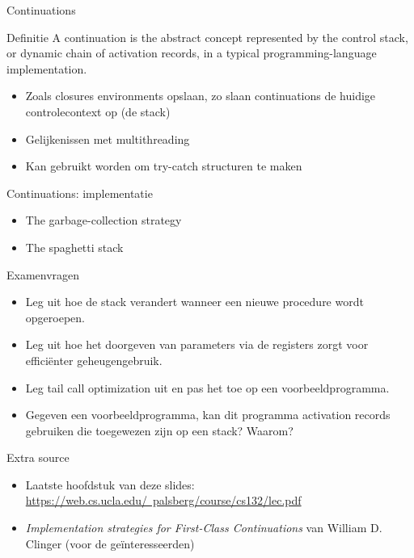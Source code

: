 \documentclass{beamer}
\begin{document}
\begin{frame}{Continuations}
	\begin{block}{Definitie}
	    A continuation is the abstract concept represented by the control stack, or dynamic chain of activation records, in a typical programming-language implementation.
	\end{block}
	\begin{itemize}
	    \item Zoals closures environments opslaan, zo slaan continuations de huidige controlecontext op (de stack)
	    \item Gelijkenissen met multithreading
	    \item Kan gebruikt worden om try-catch structuren te maken
	\end{itemize}
\end{frame}

\begin{frame}{Continuations: implementatie}
	\begin{itemize}
	    \item The garbage-collection strategy
	    \item The spaghetti stack
	\end{itemize}
\end{frame}

\begin{frame}{Examenvragen}
    \begin{itemize}
        \item Leg uit hoe de stack verandert wanneer een nieuwe procedure wordt opgeroepen.
        \item Leg uit hoe het doorgeven van parameters via de registers zorgt voor efficiënter geheugengebruik.
        \item Leg tail call optimization uit en pas het toe op een voorbeeldprogramma.
        \item Gegeven een voorbeeldprogramma, kan dit programma activation records gebruiken die toegewezen zijn op een stack? Waarom?
    \end{itemize}
\end{frame}

\begin{frame}{Extra source}
	\begin{itemize}
	    \item Laatste hoofdstuk van deze slides: \href{https://web.cs.ucla.edu/~palsberg/course/cs132/lec.pdf}{https://web.cs.ucla.edu/~palsberg/course/cs132/lec.pdf}
	    \item \emph{Implementation strategies for First-Class Continuations} van William D. Clinger (voor de geïnteresseerden)
	\end{itemize}
\end{frame}
\end{document}
